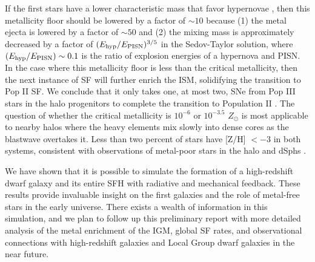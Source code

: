 \documentclass[12pt,preprint]{aastex}
\newcommand{\tvir}{\ifmmode{T_{\rm{vir}}}\else{$T_{\rm{vir}}$}\fi}
\newcommand\tento[1]{$10^{#1}$}
\begin{document}
If the first stars have a lower characteristic mass that favor
hypernovae \citep{Tumlinson07_IMF}, then this metallicity floor should
be lowered by a factor of $\sim 10$ because (1) the metal ejecta is
lowered by a factor of $\sim 50$ and (2) the mixing mass is
approximately decreased by a factor of $(E_{\rm hyp}/E_{\rm
  PISN})^{3/5}$ in the Sedov-Taylor solution, where $(E_{\rm
  hyp}/E_{\rm PISN}) \sim 0.1$ is the ratio of explosion energies of a
hypernova and PISN.  In the case where this metallicity floor is less
than the critical metallicity, then the next instance of SF will
further enrich the ISM, solidifying the transition to Pop II SF.  We
conclude that it only takes one, at most two, SNe from Pop III stars
in the halo progenitors to complete the transition to Population II
\citep{Frebel10}.  The question of whether the critical metallicity is
\tento{-6} or \tento{-3.5} $Z_\odot$ is most applicable to nearby
halos where the heavy elements mix slowly into dense cores as the
blastwave overtakes it.  Less than two percent of stars have [Z/H] $<
-3$ in both systems, consistent with observations of metal-poor stars
in the halo and dSphs \citep{Beers05, Battaglia10}.


We have shown that it is possible to simulate the formation of a
high-redshift dwarf galaxy and its entire SFH with radiative and
mechanical feedback.  These results provide invaluable insight on the
first galaxies and the role of metal-free stars in the early universe.
There exists a wealth of information in this simulation, and we plan
to follow up this preliminary report with more detailed analysis of
the metal enrichment of the IGM, global SF rates, and observational
connections with high-redshift galaxies and Local Group dwarf galaxies
in the near future.
\end{document}
